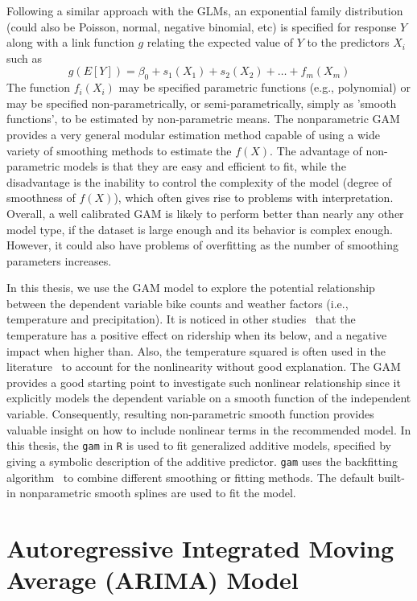 \documentclass [11pt, proquest] {uwthesis}[2015/03/03]
\begin{document}
Following a similar approach with the GLMs, an exponential family distribution (could also be Poisson, normal, negative binomial, etc) is specified for response $Y$ along with a link function $g$ relating the expected value of $Y$ to the predictors $X_i$ such as
\begin{equation*}
g(E[Y]) = \beta_0 + s_1(X_1) + s_2(X_2) + \hdots + f_m(X_m)
\end{equation*}
The function $f_i(X_i)$ may be specified parametric functions (e.g., polynomial) or may be specified non-parametrically, or semi-parametrically, simply as 'smooth functions', to be estimated by non-parametric means. The nonparametric GAM provides a very general modular estimation method capable of using a wide variety of smoothing methods to estimate the $f(X)$. The advantage of non-parametric models is that they are easy and efficient to fit, while the disadvantage is the inability to control the complexity of the model (degree of smoothness of $f(X)$), which often gives rise to problems with interpretation. Overall, a well calibrated GAM is likely to perform better than nearly any other model type, if the dataset is large enough and its behavior is complex enough. However, it could also have problems of overfitting as the number of smoothing parameters increases. 

In this thesis, we use the GAM model to explore the potential relationship between the dependent variable bike counts and weather factors (i.e., temperature and precipitation). It is noticed in other studies~\cite{} that the temperature has a positive effect on ridership when its below, and a negative impact when higher than. Also, the temperature squared is often used in the literature~\cite{} to account for the nonlinearity without good explanation. The GAM provides a good starting point to investigate such nonlinear relationship since it explicitly models the dependent variable on a smooth function of the independent variable. Consequently, resulting non-parametric smooth function provides valuable insight on how to include nonlinear terms in the recommended model. In this thesis, the \texttt{gam} in \texttt{R} is used to fit generalized additive models, specified by giving a symbolic description of the additive predictor. \texttt{gam} uses the backfitting algorithm~\cite{} to combine different smoothing or fitting methods. The default built-in nonparametric smooth splines are used to fit the model. 

\section{Autoregressive Integrated Moving Average (ARIMA) Model}
\label{arimaintro}
\end{document}
